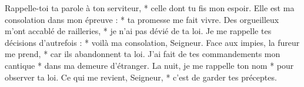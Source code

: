 Rappelle-toi ta parole à ton serviteur, *
celle dont tu fis mon espoir.
\versseparator
Elle est ma consolation dans mon épreuve : *
ta promesse me fait vivre.
\versseparator
Des orgueilleux m’ont accablé de railleries, *
je n’ai pas dévié de ta loi.
\versseparator
Je me rappelle tes décisions d’autrefois : *
voilà ma consolation, Seigneur.
\versseparator
Face aux impies, la fureur me prend, *
car ils abandonnent ta loi.
\versseparator
J’ai fait de tes commandements mon cantique *
dans ma demeure d’étranger.
\versseparator
La nuit, je me rappelle ton nom *
pour observer ta loi.
\versseparator
Ce qui me revient, Seigneur, *
c’est de garder tes préceptes.
